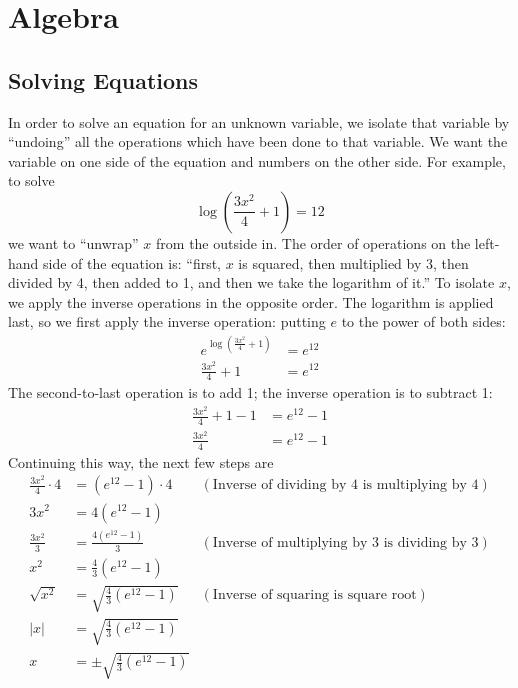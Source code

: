 \section{Algebra}

\subsection{Solving Equations}

In order to solve an equation for an unknown variable, we isolate that variable by ``undoing'' all the operations which have been done to that variable. We want the variable on one side of the equation and numbers on the other side. For example, 
to solve
\begin{equation*}
    \log\left(\frac{3x^2}{4} + 1\right) = 12
\end{equation*}
we want to ``unwrap'' $x$ from the outside in. The order of operations on the left-hand side of the equation is: ``first, $x$ is squared, then multiplied by 3, then divided by 4, then added to 1, and then we take the logarithm of it.'' To isolate $x$, we apply the inverse operations in 
the opposite order. The logarithm is applied last, so we first apply the inverse operation: putting $e$ to the power of both sides:
\begin{equation*}
    \begin{aligned}
        e^{\log\left(\frac{3x^2}{4} + 1\right)} & = e^{12} \\
       \frac{3x^2}{4} + 1 & = e^{12} 
    \end{aligned}
\end{equation*}
The second-to-last operation is to add 1; the inverse operation is to subtract 1:
\begin{equation*}
    \begin{aligned}
       \frac{3x^2}{4} + 1 - 1 & = e^{12} - 1 \\ 
       \frac{3x^2}{4} & = e^{12} - 1 
    \end{aligned}
\end{equation*}
Continuing this way, the next few steps are 
\begin{equation*}
    \begin{aligned}
       \frac{3x^2}{4} \cdot 4 & = (e^{12} - 1) \cdot 4 &  (\text{Inverse of dividing by 4 is multiplying by 4}) \\  
        3x^2 & = 4 (e^{12} - 1) \\ 
        \frac{3x^2}{3} & = \frac{4 (e^{12} - 1)}{3}  &  (\text{Inverse of multiplying by 3 is dividing by 3}) \\
        x^2 & = \frac{4}{3} (e^{12} - 1) \\ 
        \sqrt{x^2} & = \sqrt{\frac{4}{3} (e^{12} - 1)} &  (\text{Inverse of squaring is square root}) \\ 
        |x| & = \sqrt{\frac{4}{3} (e^{12} - 1)} \\ 
        x & = \pm \sqrt{\frac{4}{3} (e^{12} - 1)}
    \end{aligned}
\end{equation*}

